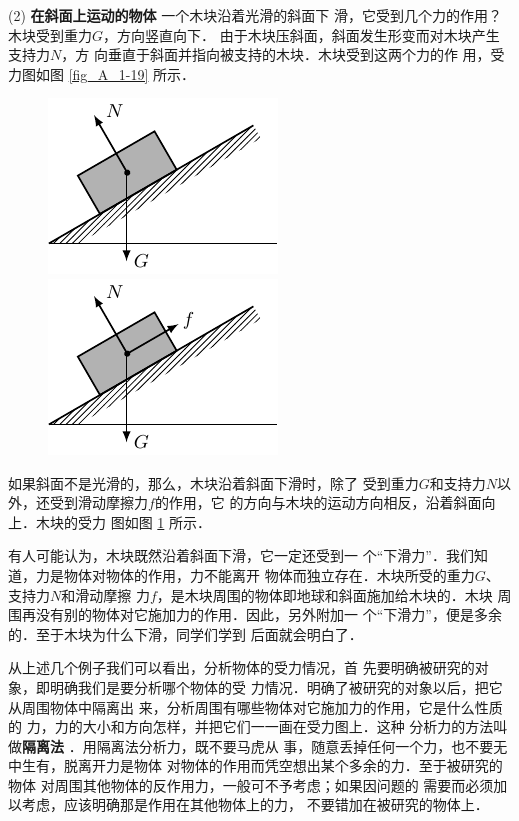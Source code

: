     (2) \textbf{在斜面上运动的物体 }  一个木块沿着光滑的斜面下
滑，它受到几个力的作用？木块受到重力$G$，方向竖直向下．
由于木块压斜面，斜面发生形变而对木块产生支持力$N$，方
向垂直于斜面并指向被支持的木块．木块受到这两个力的作
用，受力图如图 \ref{fig_A_1-19} 所示．

\begin{figure} [htp]\centering
	\begin{minipage} [t]{0.48\textwidth} 
		\centering
		\includegraphics{fig/A/1-19.pdf} 
		\caption{} \label{fig_A_1-19} 
	\end{minipage} 
	\begin{minipage} [t]{0.48\textwidth} 
		\centering
		\includegraphics{fig/A/1-20.pdf} 
		\caption{} \label{fig_A_1-20} 
	\end{minipage} 
\end{figure} 


    如果斜面不是光滑的，那么，木块沿着斜面下滑时，除了
受到重力$G$和支持力$N$以外，还受到滑动摩擦力$f$的作用，它
的方向与木块的运动方向相反，沿着斜面向上．木块的受力
图如图 \ref{fig_A_1-20} 所示．


有人可能认为，木块既然沿着斜面下滑，它一定还受到一
个“下滑力”．我们知道，力是物体对物体的作用，力不能离开
物体而独立存在．木块所受的重力$G$、支持力$N$和滑动摩擦
力$f$，是木块周围的物体即地球和斜面施加给木块的．木块
周围再没有别的物体对它施加力的作用．因此，另外附加一
个“下滑力”，便是多余的．至于木块为什么下滑，同学们学到
后面就会明白了．

    从上述几个例子我们可以看出，分析物体的受力情况，首
先要明确被研究的对象，即明确我们是要分析哪个物体的受
力情况．明确了被研究的对象以后，把它从周围物体中隔离出
来，分析周围有哪些物体对它施加力的作用，它是什么性质的
力，力的大小和方向怎样，并把它们一一画在受力图上．这种
分析力的方法叫做\textbf{隔离法} ．用隔离法分析力，既不要马虎从
事，随意丢掉任何一个力，也不要无中生有，脱离开力是物体
对物体的作用而凭空想出某个多余的力．至于被研究的物体
对周围其他物体的反作用力，一般可不予考虑；如果因问题的
需要而必须加以考虑，应该明确那是作用在其他物体上的力，
不要错加在被研究的物体上．

